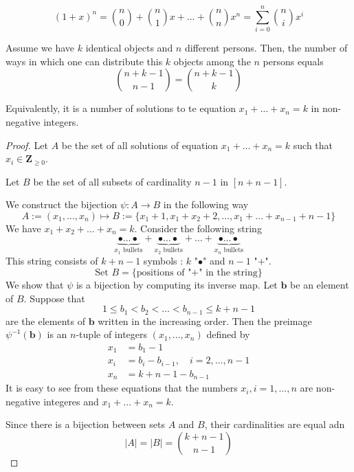 \begin{theorem}
$$
(1+x)^{n}={n\choose 0}+{n\choose 1}x+\dots+{n\choose n}x^{n}=\sum_{i=0}^{n} {n\choose i}x^{i}
$$
\end{theorem}
\begin{proposition}
Assume we have $k$ identical objects and $n$ different persons. Then, the number of ways in which one can distribute this $k$ objects among the $n$ persons equals
$$
{n+k-1\choose n-1}={n+k-1\choose k}
$$
\end{proposition}
\begin{remark}
Equivalently, it is a number of solutions to te equation $x_{1}+\dots+x_{n}=k$ in non-negative integers.
\end{remark}
\begin{proof}
Let $A$ be the set of all solutions of equation $x_{1}+\dots+x_{n}=k$ such that $x_{i}\in \mathbf{Z}_{\geq 0}$.

Let $B$ be the set of all subsets of cardinality $n-1$ in $[n+n-1]$.

We construct the bijection $\psi:A\to B$ in the following way
$$
A:= (x_{1},\dots,x_{n})\mapsto B:= \{ x_{1}+1,x_{1}+x_{2}+2,\dots,x_{1}+\dots+x_{n-1}+n-1 \}
$$
We have $x_{1}+x_{2}+\dots+x_{n}=k$. Consider the following string
$$
\underbrace{ \bullet\dots \bullet }_{ x_{1}\text{ bullets} }+\underbrace{ \bullet\dots \bullet }_{ x_{2}\text{ bullets} }+\dots+\underbrace{ \bullet\dots \bullet }_{ x_{n}\text{ bullets} }
$$
This string consists of $k+n-1$ symbols : $k$ "$\bullet$" and $n-1$ "$+$".
$$
\text{Set } B=\{ \text{positions of "+" in the string} \}
$$
We show that $\psi$ is a bijection by computing its inverse map. Let $\mathbf{b}$ be an element of $B$. Suppose that
$$
1\leq b_{1}<b_{2}<\dots<b_{n-1}\leq k+n-1
$$
are the elements of $\mathbf{b}$ written in the increasing order. Then the preimage $\psi ^{-1}(\mathbf{b})$ is an $n$-tuple of integers $(x_{1},\dots,x_{n})$ defined by
\begin{align*}
x_{1} & =b_{1}-1 \\
x_{i} & =b_{i}-b_{i-1},\quad i=2,\dots,n-1 \\
x_{n} & =k+n-1-b_{n-1}
\end{align*}
It is easy to see from these equations that the numbers $x_{i},i=1,\dots,n$ are non-negative integeres and $x_{1}+\dots+x_{n}=k$.

Since there is a bijection between sets $A$ and $B$, their cardinalities are equal adn
$$
|A|=|B|={k+n-1\choose n-1}
$$
\end{proof}

